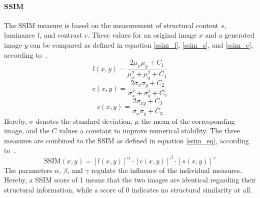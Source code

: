 \paragraph*{SSIM}
The SSIM measure is based on the measurement of structural content $s$, luminance $l$, and contrast $c$. 
These values for an original image $x$ and a generated image $y$ can be compared as defined in equation \ref{ssim_l}, \ref{ssim_s}, and \ref{ssim_c}, according to~\cite{wang2004image}.
\begin{equation}
    l(x, y) =  \frac{2\mu_x\mu_y + C_1}{\mu^2_x + \mu^2_y + C_1}
    \label{ssim_l}
\end{equation}
\begin{equation}
    c(x, y) =  \frac{2\sigma_x\sigma_y + C_2}{\sigma^2_x + \sigma^2_y + C_2}
    \label{ssim_s}
\end{equation}
\begin{equation}
    s(x, y) =  \frac{2\sigma_{xy} + C_3}{\sigma_x\sigma_y + C_3}
    \label{ssim_c}
\end{equation}
Hereby, $\sigma$ denotes the standard deviation, $\mu$ the mean of the corresponding image, and the $C$ values a constant to improve numerical stability. 
The three measures are combined to the SSIM as defined in equation \ref{ssim_eq}, according to~\cite{wang2004image}.
\begin{equation}
    \text{SSIM}(x, y) = [l(x,y)]^\alpha \cdot [c(x,y)]^\beta \cdot [s(x,y)]^\gamma
    \label{ssim_eq}
\end{equation}
The parameters $\alpha$, $\beta$, and $\gamma$ regulate the influence of the individual measures. 
Hereby, a SSIM score of 1 means that the two images are identical regarding their structural information, while a score of 0 indicates no structural similarity at all.

